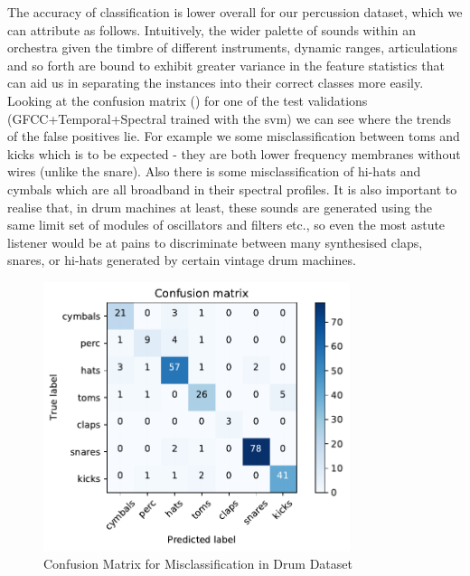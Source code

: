{{{{{{{The accuracy of classification is lower overall for our percussion dataset, which we can attribute as follows. Intuitively, the wider palette of sounds within an orchestra given the timbre of different instruments, dynamic ranges, articulations and so forth are bound to exhibit greater variance in the feature statistics that can aid us in separating the instances into their correct classes more easily. Looking at the confusion matrix () for one of the test validations (GFCC+Temporal+Spectral trained with the \acrshort{svm}) we can see where the trends of the false positives lie. For example we some misclassification between toms and kicks which is to be expected - they are both lower frequency membranes without wires (unlike the snare). Also there is some misclassification of hi-hats and cymbals which are all broadband in their spectral profiles. It is also important to realise that, in drum machines at least, these sounds are generated using the same limit set of modules of oscillators and filters etc., so even the most astute listener would be at pains to discriminate between many synthesised claps, snares, or hi-hats generated by  certain vintage drum machines.

\begin{figure}
	\begin{center}
		\includegraphics[width=0.8\textwidth]{ch05_pyconcat/figures/drum_confusion.pdf}
	\end{center}
	\caption[Confusion Matrix for Misclassification in Drum Dataset]{Confusion Matrix for Misclassification in Drum Dataset}
	\label{fig:drum_confusion}
\end{figure}

}}}}}}}
